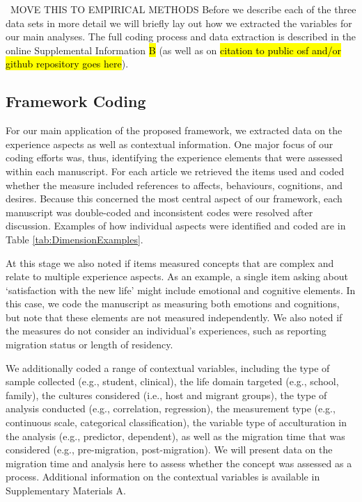 \documentclass[man, 12pt, a4paper]{apa7}
\newcommand\Warning[1][2ex]{%
  \renewcommand\stacktype{L}%
  \scaleto{\stackon[1.3pt]{\color{red}$\triangle$}{\tiny\bfseries !}}{#1}}%
\begin{document}
\Warning\ MOVE THIS TO EMPIRICAL METHODS \Warning
Before we describe each of the three data sets in more detail we will briefly lay out how we extracted the variables for our main analyses. The full coding process and data extraction is described in the online Supplemental Information \hl{B} (as well as on \hl{citation to public osf and/or github repository goes here}).

\subsection{Framework Coding}
For our main application of the proposed framework, we extracted data on the experience aspects as well as contextual information. One major focus of our coding efforts was, thus, identifying the experience elements that were assessed within each manuscript. For each article we retrieved the items used and coded whether the measure included references to affects, behaviours, cognitions, and desires. Because this concerned the most central aspect of our framework, each manuscript was double-coded and inconsistent codes were resolved after discussion. Examples of how individual aspects were identified and coded are in Table \ref{tab:DimensionExamples}.


At this stage we also noted if items measured concepts that are complex and relate to multiple experience aspects. As an example, a single item asking about `satisfaction with the new life' might include emotional and cognitive elements. In this case, we code the manuscript as measuring both emotions and cognitions, but note that these elements are not measured independently. We also noted if the measures do not consider an individual's experiences, such as reporting migration status or length of residency.

We additionally coded a range of contextual variables, including the type of sample collected (e.g., student, clinical), the life domain targeted (e.g., school, family), the cultures considered (i.e., host and migrant groups), the type of analysis conducted (e.g., correlation, regression), the measurement type (e.g., continuous scale, categorical classification), the variable type of acculturation in the analysis (e.g., predictor, dependent), as well as the migration time that was considered (e.g., pre-migration, post-migration). We will present data on the migration time and analysis here to assess whether the concept was assessed as a process. Additional information on the contextual variables is available in Supplementary Materials A.
\end{document}
